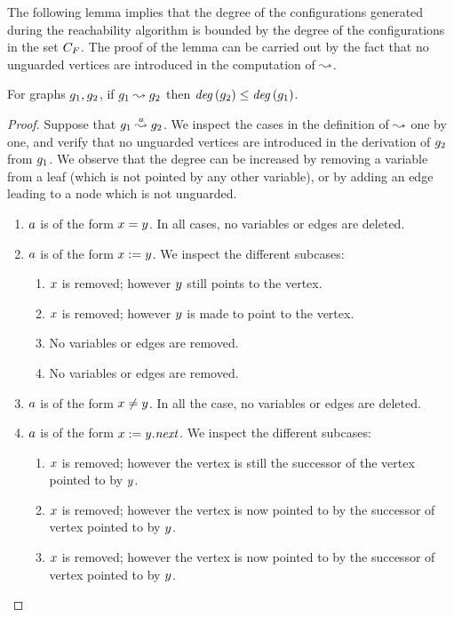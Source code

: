 The following lemma implies that the degree of the configurations generated during the reachability
algorithm is bounded by the degree of the configurations in the set $C_F$.
%
The proof of the lemma can be carried out by the fact that no unguarded vertices
are introduced in the computation of $\stackrel{}{\leadsto}$.
%
\begin{lemma}
\label{backward:bounded:degree:lemma}
For graphs $g_1,g_2$, if $g_1\stackrel{}{\leadsto}g_2$
then ${\it deg}\left(g_2\right)\leq{\it deg}\left(g_1\right)$.
\end{lemma}
\begin{proof}
Suppose that $g_1\stackrel{a}{\leadsto}g_2$.
%
We inspect the cases in the definition of $\stackrel{}{\leadsto}$ one by one, and 
verify that no unguarded vertices are introduced in the derivation 
of $g_2$ from $g_1$.
%
We observe that the degree can be increased by removing a variable from a leaf 
(which is not pointed by any other variable),
or by adding an edge leading to a node which is not unguarded.
%
\begin{enumerate}
\item
$a$ is of the form $x=y$.
%
In all cases, no variables or edges are deleted.
\item
$a$ is of the form $x:=y$.
%
We inspect the different subcases:
\begin{enumerate}
\item $x$ is removed; however $y$ still points to the vertex.
\item $x$ is removed; however $y$ is made to point to the vertex.
\item No variables or edges are removed.
\item No variables or edges are removed.
\end{enumerate}
\item $a$ is of the form  $x\neq y$.
In all the case, no variables or edges are deleted.
%
\item $a$ is of the form $x:=y.{\it next}$.
%
We inspect the different subcases:
\begin{enumerate}
\item $x$ is removed; however the vertex is still the successor of the vertex pointed to by $y$.
\item $x$ is removed; however the vertex is now pointed to by the successor of vertex pointed to by $y$.
\item $x$ is removed; however the vertex is now pointed to by the successor of vertex pointed to by $y$.

\end{enumerate}
\end{enumerate}
\end{proof}
